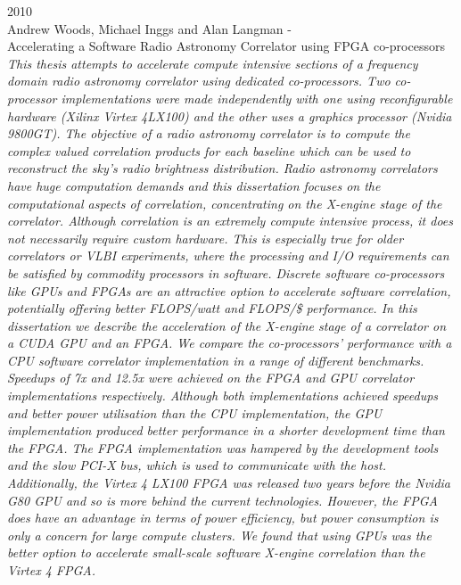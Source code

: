 \noindent
{\large 2010}\\
\noindent
{\large Andrew Woods,
Michael Inggs and Alan Langman - \hfill \\ Accelerating a Software Radio Astronomy
Correlator using FPGA co-processors }\\
\indent \textit{This thesis attempts to accelerate compute intensive sections of a frequency domain radio
astronomy correlator using dedicated co-processors. Two co-processor implementations were
made independently with one using reconfigurable hardware (Xilinx Virtex 4LX100) and the
other uses a graphics processor (Nvidia 9800GT). The objective of a radio astronomy correlator
is to compute the complex valued correlation products for each baseline which can be used
to reconstruct the sky’s radio brightness distribution. Radio astronomy correlators have huge
computation demands and this dissertation focuses on the computational aspects of correlation,
concentrating on the X-engine stage of the correlator.
Although correlation is an extremely compute intensive process, it does not necessarily require
custom hardware. This is especially true for older correlators or VLBI experiments, where
the processing and I/O requirements can be satisfied by commodity processors in software.
Discrete software co-processors like GPUs and FPGAs are an attractive option to accelerate
software correlation, potentially offering better FLOPS/watt and FLOPS/\$ performance.
In this dissertation we describe the acceleration of the X-engine stage of a correlator on a
CUDA GPU and an FPGA. We compare the co-processors’ performance with a CPU software
correlator implementation in a range of different benchmarks. Speedups of 7x and 12.5x were
achieved on the FPGA and GPU correlator implementations respectively.
Although both implementations achieved speedups and better power utilisation than the CPU
implementation, the GPU implementation produced better performance in a shorter development
time than the FPGA. The FPGA implementation was hampered by the development
tools and the slow PCI-X bus, which is used to communicate with the host. Additionally, the
Virtex 4 LX100 FPGA was released two years before the Nvidia G80 GPU and so is more behind
the current technologies. However, the FPGA does have an advantage in terms of power
efficiency, but power consumption is only a concern for large compute clusters. We found that
using GPUs was the better option to accelerate small-scale software X-engine correlation than
the Virtex 4 FPGA.
}\\

